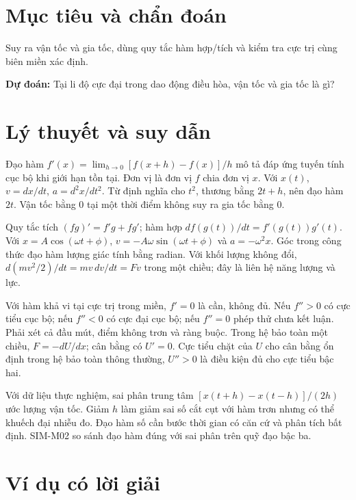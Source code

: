 \documentclass[11pt,a4paper,openany]{book}
\begin{document}
\section{Mục tiêu và chẩn đoán}
Suy ra vận tốc và gia tốc, dùng quy tắc hàm hợp/tích và kiểm tra cực trị cùng biên miền xác định.

\textbf{Dự đoán:} Tại li độ cực đại trong dao động điều hòa, vận tốc và gia tốc là gì?
\section{Lý thuyết và suy dẫn}
Đạo hàm $f'(x)=\lim_{h\to0}[f(x+h)-f(x)]/h$ mô tả đáp ứng tuyến tính cục bộ khi giới hạn tồn tại. Đơn vị là đơn vị $f$ chia đơn vị $x$. Với $x(t)$, $v=dx/dt$, $a=d^2x/dt^2$. Từ định nghĩa cho $t^2$, thương bằng $2t+h$, nên đạo hàm $2t$. Vận tốc bằng 0 tại một thời điểm không suy ra gia tốc bằng 0.

Quy tắc tích $(fg)'=f'g+fg'$; hàm hợp $d f(g(t))/dt=f'(g(t))g'(t)$. Với $x=A\cos(\omega t+\phi)$, $v=-A\omega\sin(\omega t+\phi)$ và $a=-\omega^2x$. Góc trong công thức đạo hàm lượng giác tính bằng radian. Với khối lượng không đổi, $d(mv^2/2)/dt=mv\,dv/dt=Fv$ trong một chiều; đây là liên hệ năng lượng và lực.

Với hàm khả vi tại cực trị trong miền, $f'=0$ là cần, không đủ. Nếu $f''>0$ có cực tiểu cục bộ; nếu $f''<0$ có cực đại cục bộ; nếu $f''=0$ phép thử chưa kết luận. Phải xét cả đầu mút, điểm không trơn và ràng buộc. Trong hệ bảo toàn một chiều, $F=-dU/dx$; cân bằng có $U'=0$. Cực tiểu chặt của $U$ cho cân bằng ổn định trong hệ bảo toàn thông thường, $U''>0$ là điều kiện đủ cho cực tiểu bậc hai.

Với dữ liệu thực nghiệm, sai phân trung tâm $[x(t+h)-x(t-h)]/(2h)$ ước lượng vận tốc. Giảm $h$ làm giảm sai số cắt cụt với hàm trơn nhưng có thể khuếch đại nhiễu đo. Đạo hàm số cần bước thời gian có căn cứ và phân tích bất định. SIM-M02 so sánh đạo hàm đúng với sai phân trên quỹ đạo bậc ba.
\begin{center}
\end{center}
\section{Ví dụ có lời giải}
\end{document}
